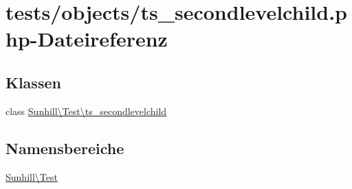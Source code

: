 \hypertarget{ts__secondlevelchild_8php}{}\section{tests/objects/ts\+\_\+secondlevelchild.php-\/\+Dateireferenz}
\label{ts__secondlevelchild_8php}
\subsection*{Klassen}
\begin{DoxyCompactItemize}
\item 
class \hyperlink{classSunhill_1_1Test_1_1ts__secondlevelchild}{Sunhill\textbackslash{}\+Test\textbackslash{}ts\+\_\+secondlevelchild}
\end{DoxyCompactItemize}
\subsection*{Namensbereiche}
\begin{DoxyCompactItemize}
\item 
 \hyperlink{namespaceSunhill_1_1Test}{Sunhill\textbackslash{}\+Test}
\end{DoxyCompactItemize}
